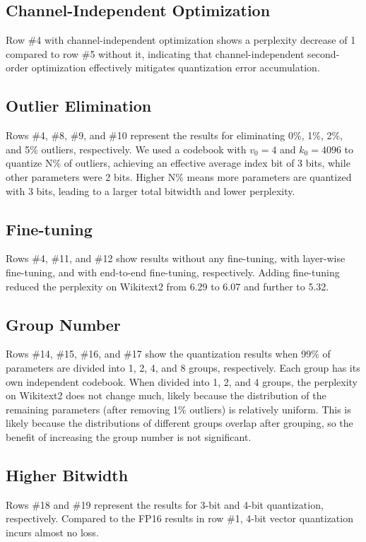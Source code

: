 \subsection{Channel-Independent Optimization}
Row \#4 with channel-independent optimization shows a perplexity decrease of 1 compared to row \#5 without it, indicating that channel-independent second-order optimization effectively mitigates quantization error accumulation.

\subsection{Outlier Elimination}
Rows \#4, \#8, \#9, and \#10 represent the results for eliminating 0\%, 1\%, 2\%, and 5\% outliers, respectively. We used a codebook with $v_0=4$ and $k_0=4096$ to quantize N\% of outliers, achieving an effective average index bit of 3 bits, while other parameters were 2 bits. Higher N\% means more parameters are quantized with 3 bits, leading to a larger total bitwidth and lower perplexity.

\subsection{Fine-tuning}
Rows \#4, \#11, and \#12 show results without any fine-tuning, with layer-wise fine-tuning, and with end-to-end fine-tuning, respectively. Adding fine-tuning reduced the perplexity on Wikitext2 from 6.29 to 6.07 and further to 5.32.

\subsection{Group Number}
Rows \#14, \#15, \#16, and \#17 show the quantization results when 99\% of parameters are divided into 1, 2, 4, and 8 groups, respectively. Each group has its own independent codebook. When divided into 1, 2, and 4 groups, the perplexity on Wikitext2 does not change much, likely because the distribution of the remaining parameters (after removing 1\% outliers) is relatively uniform. This is likely because the distributions of different groups overlap after grouping, so the benefit of increasing the group number is not significant.

\subsection{Higher Bitwidth}
Rows \#18 and \#19 represent the results for 3-bit and 4-bit quantization, respectively. Compared to the FP16 results in row \#1, 4-bit vector quantization incurs almost no loss.

